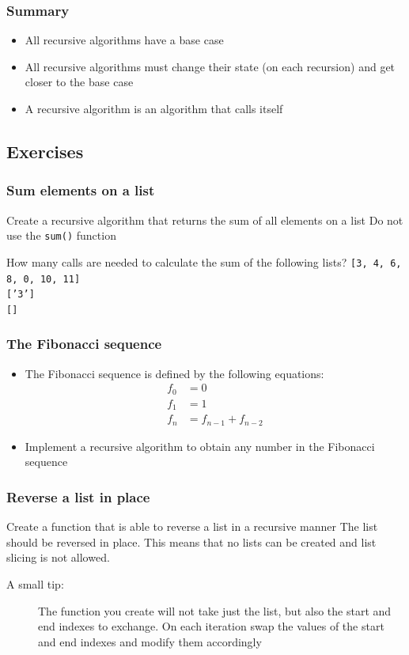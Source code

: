 \documentclass[11pt]{beamer}
\begin{document}
\begin{frame}\frametitle{Summary}
\begin{itemize}
\item All recursive algorithms have a base case
\item All recursive algorithms must change their state (on each recursion) and get closer to the base case
\item A recursive algorithm is an algorithm that calls itself
\end{itemize}
\end{frame}

\subsection{Exercises}

\begin{frame}\frametitle{Sum elements on a list}
\begin{block}{Create a recursive algorithm that returns the sum of all elements on a list}
Do not use the \texttt{sum()} function
\end{block}
\begin{block}{How many calls are needed to calculate the sum of the following lists?}
\texttt{[3, 4, 6, 8, 0, 10, 11]} \\
\texttt{['3']} \\
\texttt{[]}
\end{block}
\end{frame}

\begin{frame}\frametitle{The Fibonacci sequence}
\begin{itemize}
\item The Fibonacci sequence is defined by the following equations:
\begin{equation*}
\begin{aligned}
f_0 &= 0\\
f_1 &= 1\\
f_n &= f_{n-1} + f_{n-2}
\end{aligned}
\end{equation*}
\item Implement a recursive algorithm to obtain any number in the Fibonacci sequence
\end{itemize}
\end{frame}

\begin{frame}\frametitle{Reverse a list in place}
\begin{block}{Create a function that is able to reverse a list in a recursive manner}
The list should be reversed in place. This means that no lists can be created and list slicing is not allowed.
\end{block}
\begin{description}
\item[A small tip:] The function you create will not take just the list, but also the start and end indexes to exchange. On each iteration swap the values of the start and end indexes and modify them accordingly
\end{description}
\end{frame}
\end{document}
